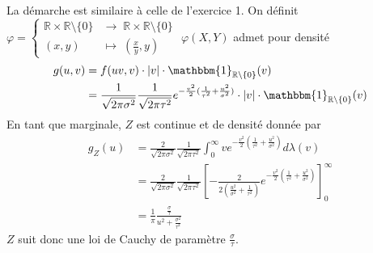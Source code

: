 \documentclass{report}
\begin{document}
\subsection{} \noindent{}\\ 
\\ 
\\
\noindent La démarche est similaire à celle de l'exercice 1. \newline
On définit 
 $\varphi=
    \begin{cases}
      \mathbb R \times \mathbb R\setminus \{0\} & \longrightarrow \; \mathbb R \times \mathbb R\setminus \{0\} \\
      (x,y) & \longmapsto \; (\frac{x}{y},y)
    \end{cases}$ \newline
$\varphi(X,Y)$ admet pour densité 
$$\begin{aligned}
g(u,v)&=f(uv,v) \cdot |v| \cdot \mathbbm{1}_{\mathbb R\setminus \{0\}}(v) \\
&= \frac{1}{\sqrt{2\pi \sigma^2}}\frac{1}{\sqrt{2\pi \tau^2}} e^{-\frac{v^2}{2}(\frac{1}{\tau^2} + \frac{u^2}{\sigma^2})} \cdot |v| \cdot \mathbbm{1}_{\mathbb R\setminus \{0\}}(v)
\end{aligned}$$
En tant que marginale, $Z$ est continue et de densité donnée par 
$$\begin{aligned}
g_Z(u) &= \frac{2}{\sqrt{2\pi \sigma^2}}\frac{1}{\sqrt{2\pi \tau^2}} \int_0^{\infty} v e^{-\frac{v^2}{2}(\frac{1}{\tau^2} + \frac{u^2}{\sigma^2})} d\lambda(v) \\
&= \frac{2}{\sqrt{2\pi \sigma^2}}\frac{1}{\sqrt{2\pi \tau^2}} \left[-\frac{2}{2\left( \frac{u^2}{\sigma^2} + \frac{1}{\tau^2}\right)} e^{-\frac{v^2}{2}(\frac{1}{\tau^2} + \frac{u^2}{\sigma^2})} \right]_0^{\infty}\\
&= \frac 1\pi \frac{\frac{\sigma}{\tau}}{u^2+\frac{\sigma^2}{\tau^2}}
\end{aligned}$$
$Z$ suit donc une loi de Cauchy de paramètre $\frac{\sigma}{\tau}$.
\end{document}
